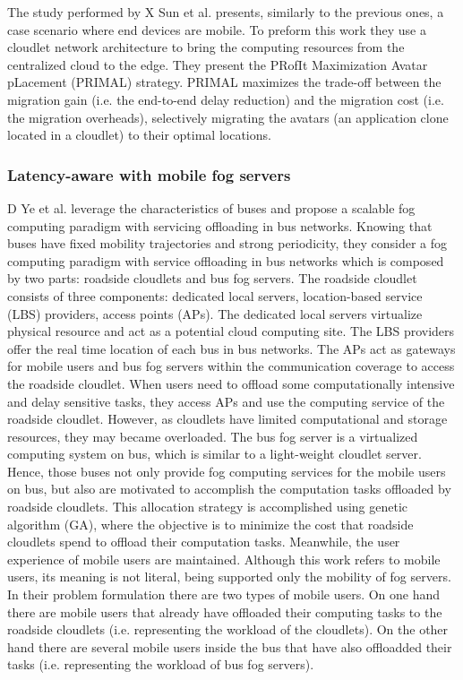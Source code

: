 \noindent\tab The study performed by X Sun et al. \cite{sun2016primal} presents, similarly to the previous ones, a case scenario where end devices are mobile. To preform this work they use a cloudlet network architecture to bring the computing resources from the centralized cloud to the edge. They present the PRofIt Maximization Avatar pLacement (PRIMAL) strategy. PRIMAL maximizes the trade-off between the migration gain (i.e. the end-to-end delay reduction) and the migration cost (i.e. the migration overheads), selectively migrating the avatars (an application clone located in a cloudlet) to their optimal locations.\\ %

\noindent\tab 

\subsubsection{Latency-aware with mobile fog servers}
D Ye et al. \cite{ye2016scalable} leverage the characteristics of buses and propose a scalable fog computing paradigm with servicing offloading in bus networks. Knowing that buses have fixed mobility trajectories and strong periodicity, they consider a fog computing paradigm with service offloading in bus networks which is composed by two parts: roadside cloudlets and bus fog servers. The roadside cloudlet consists of three components: dedicated local servers, location-based service (LBS) providers, access points (APs). The dedicated local servers virtualize physical resource and act as a potential cloud computing site. The LBS providers offer the real time location of each bus in bus networks. The APs act as gateways for mobile users and bus fog servers within the communication coverage to access the roadside cloudlet. When users need to offload some computationally intensive and delay sensitive tasks, they access APs and use the computing service of the roadside cloudlet. However, as cloudlets have limited computational and storage resources, they may became overloaded. The bus fog server is a virtualized computing system on bus, which is similar to a light-weight cloudlet server. Hence, those buses not only provide fog computing services for the mobile users on bus, but also are motivated to accomplish the computation tasks offloaded by roadside cloudlets. This allocation strategy is accomplished using genetic algorithm (GA), where the objective is to minimize the cost that roadside cloudlets spend to offload their computation tasks. Meanwhile, the user experience of mobile users are maintained. Although this work refers to mobile users, its meaning is not literal, being supported only the mobility of fog servers. In their problem formulation there are two types of mobile users. On one hand there are mobile users that already have offloaded their computing tasks to the roadside cloudlets (i.e. representing the workload of the cloudlets). On the other hand there are several mobile users inside the bus that have also offloadded their tasks (i.e. representing the workload of bus fog servers).%


